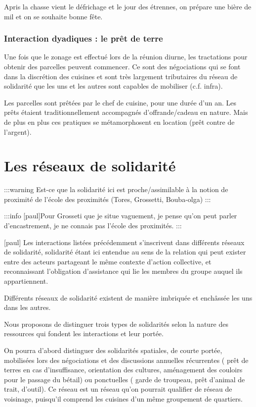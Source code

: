 Apris la chasse vient le défrichage  et  le jour des étrennes, on prépare une bière de mil et on se souhaite bonne fête.


\subsubsection{Interaction dyadiques : le prêt de terre }

Une fois que le zonage est effectué lors de la réunion diurne, les tractations pour obtenir des parcelles  peuvent commencer. Ce sont des négociations qui se font dans la discrétion des cuisines et sont très largement tributaires du réseau de solidarité que les uns et les autres sont capables de mobiliser (c.f. infra).

Les parcelles sont prêtées par le chef de cuisine, pour une durée d'un an. Les prêts étaient traditionnellement accompagnés d'offrande/cadeau en nature. Mais de plus en plus ces pratiques se métamorphosent en location (prêt contre de l'argent).

\section{Les réseaux de solidarité}

:::warning
Est-ce que la solidarité ici est proche/assimilable à la notion de proximité de l'école des proximités (Tores, Grossetti, Bouba-olga)
:::

:::info
[paul]Pour Grosseti que je situe vaguement, je pense qu'on peut parler d'encastrement, je ne connais pas l'école des proximités.
:::

[paul] Les interactions listées précédemment s'inscrivent dans différents réseaux de solidarité, solidarité étant ici entendue au sens de la relation qui peut exister entre des acteurs partageant le même contexte d'action collective, et reconnaissant l'obligation d'assistance qui lie les membres du groupe auquel ils appartiennent.


Différents réseaux de solidarité existent de manière imbriquée et enchâssée les uns dans les autres. 

Nous proposons de distinguer trois types de solidarités selon la nature des ressources qui fondent les interactions et leur portée.

On pourra d'abord distinguer des solidarités spatiales, de courte portée,  mobilisées lors des négociations et des discussions annuelles récurrentes ( prêt de terres en cas d'insuffisance, orientation des cultures, aménagement des couloirs pour le passage du bétail) ou ponctuelles ( garde de troupeau, prêt d'animal de trait, d'outil). 
Ce réseau est un réseau qu'on pourrait qualifier de réseau de  voisinage, puisqu'il comprend les cuisines d'un même groupement de quartiers. 


